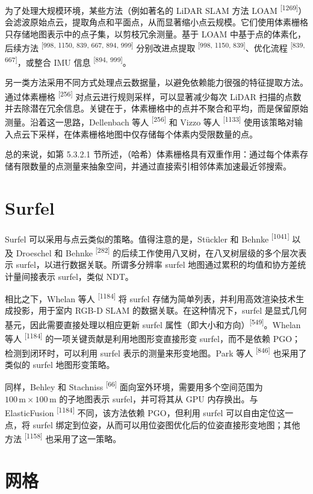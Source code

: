 为了处理大规模环境，某些方法（例如著名的 LiDAR SLAM 方法 LOAM \textsuperscript{[1269]}）会滤波原始点云，提取角点和平面点，从而显著缩小点云规模。它们使用体素栅格只存储地图表示中的点子集，以剪枝冗余测量。基于 LOAM 中基于点的体素化，后续方法 \textsuperscript{[998, 1150, 839, 667, 894, 999]} 分别改进点提取 \textsuperscript{[998, 1150, 839]}、优化流程 \textsuperscript{[839, 667]}，或整合 IMU 信息 \textsuperscript{[894, 999]}。

另一类方法采用不同方式处理点云数据量，以避免依赖能力很强的特征提取方法。通过体素栅格 \textsuperscript{[256]} 对点云进行规则采样，可以显著减少每次 LiDAR 扫描的点数并去除潜在冗余信息。关键在于，体素栅格中的点并不聚合和平均，而是保留原始测量。沿着这一思路，Dellenbach 等人 \textsuperscript{[256]} 和 Vizzo 等人 \textsuperscript{[1133]} 使用该策略对输入点云下采样，在体素栅格地图中仅存储每个体素内受限数量的点。

总的来说，如第 5.3.2.1 节所述，（哈希）体素栅格具有双重作用：通过每个体素存储有限数量的点测量来抽象空间，并通过直接索引相邻体素加速最近邻搜索。

\section{Surfel}

Surfel 可以采用与点云类似的策略。值得注意的是，Stückler 和 Behnke \textsuperscript{[1041]} 以及 Droeschel 和 Behnke \textsuperscript{[282]} 的后续工作使用八叉树，在八叉树层级的多个层次表示 surfel，以进行数据关联。所谓多分辨率 surfel 地图通过累积的均值和协方差统计量间接表示 surfel，类似 NDT。

相比之下，Whelan 等人 \textsuperscript{[1184]} 将 surfel 存储为简单列表，并利用高效渲染技术生成投影，用于室内 RGB-D SLAM 的数据关联。在这种情况下，surfel 是显式几何基元，因此需要直接处理以相应更新 surfel 属性（即大小和方向）\textsuperscript{[549]}。Whelan 等人 \textsuperscript{[1184]} 的一项关键贡献是利用地图形变直接形变 surfel，而不是依赖 PGO；检测到闭环时，可以利用 surfel 表示的测量来形变地图。Park 等人 \textsuperscript{[846]} 也采用了类似的 surfel 地图形变策略。

同样，Behley 和 Stachniss \textsuperscript{[66]} 面向室外环境，需要用多个空间范围为 $100\,\mathrm{m}\times100\,\mathrm{m}$ 的子地图表示 surfel，并可将其从 GPU 内存换出。与 ElasticFusion \textsuperscript{[1184]} 不同，该方法依赖 PGO，但利用 surfel 可以自由定位这一点，将 surfel 绑定到位姿，从而可以用位姿图优化后的位姿直接形变地图；其他方法 \textsuperscript{[1158]} 也采用了这一策略。

\section{网格}

